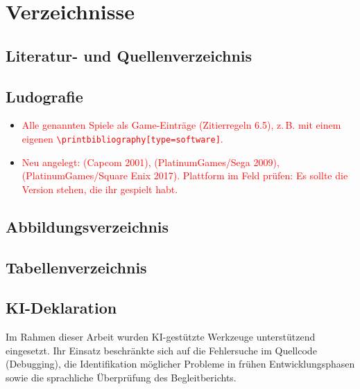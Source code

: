 \documentclass[../Main.tex]{subfiles}
\begin{document}
\section{Verzeichnisse}

\subsection{Literatur- und Quellenverzeichnis}

\printbibliography[heading=none]

\subsection{Ludografie}

\begin{itemize}[leftmargin=1.5cm]
    \item \textcolor{red}{Alle genannten Spiele als Game-Einträge (Zitierregeln 6.5), z.\,B. mit einem eigenen \texttt{\textbackslash printbibliography[type=software]}.}
    \item \textcolor{red}{Neu angelegt:  (Capcom 2001),  (PlatinumGames/Sega 2009),  (PlatinumGames/Square Enix 2017). Plattform im Feld  prüfen: Es sollte die Version stehen, die ihr gespielt habt.}
\end{itemize}

\subsection{Abbildungsverzeichnis}

\listoffigures

\subsection{Tabellenverzeichnis}

\listoftables

\subsection{KI-Deklaration} \label{sec:KIDeklaration}

Im Rahmen dieser Arbeit wurden KI-gestützte Werkzeuge unterstützend eingesetzt. Ihr Einsatz beschränkte sich auf die Fehlersuche im Quellcode (Debugging), die Identifikation möglicher Probleme in frühen Entwicklungsphasen sowie die sprachliche Überprüfung des Begleitberichts.
\end{document}

